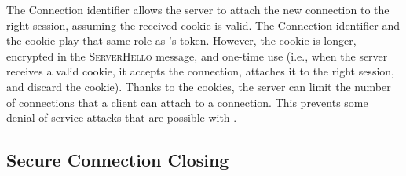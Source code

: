 The Connection identifier allows the server to attach the new \tcp connection to
the right \tcpls session, assuming the received cookie is valid. The Connection
identifier and the cookie play that same role as \mptcp's token. However, the cookie is longer, encrypted in the \textsc{ServerHello} message, and one-time use (i.e., when the server receives a valid cookie, it accepts the connection, attaches it to the right \tcpls session, and discard the cookie). Thanks to the cookies, the server can limit the number of \tcp connections that a client can attach to a \tcpls connection. This prevents some denial-of-service attacks that are possible with \mptcp.

\subsection{Secure Connection Closing}




